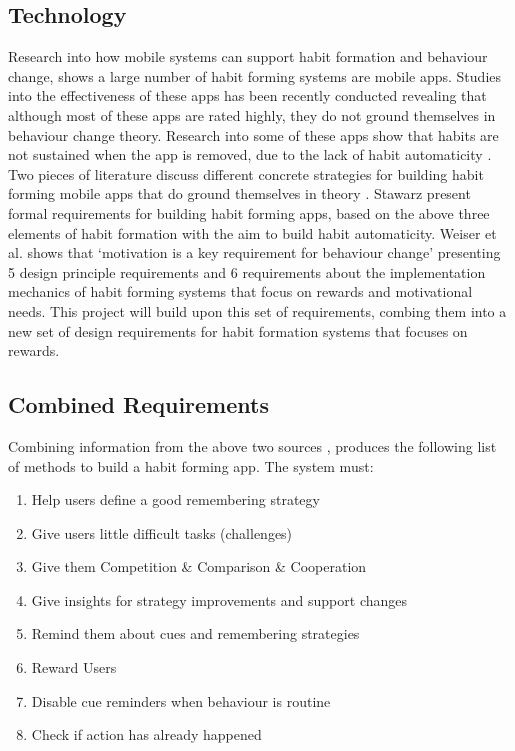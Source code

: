 \subsection{Technology}
Research into how mobile systems can support habit formation and behaviour change, shows a large number of habit forming systems are mobile apps. Studies into the effectiveness of these apps has been recently conducted \cite{article_beyond_self_tracking_designing_apps, article_dont_kick_habit} revealing that although most of these apps are rated highly, they do not ground themselves in behaviour change theory. Research into some of these apps show that habits are not sustained when the app is removed, due to the lack of habit automaticity \cite{article_beyond_self_tracking_designing_apps}.\newline
\newline
Two pieces of literature discuss different concrete strategies for building habit forming mobile apps that do ground themselves in theory \cite{thesis_kathy, article_taxonomy_motivational_affordances_meaningful}. Stawarz \cite{thesis_kathy} present formal requirements for building habit forming apps, based on the above three elements of habit formation with the aim to build habit automaticity. Weiser et al. \cite{article_taxonomy_motivational_affordances_meaningful} shows that `motivation is a key requirement for behaviour change' presenting 5 design principle requirements and 6 requirements about the implementation mechanics of habit forming systems that focus on rewards and motivational needs. This project will build upon this set of requirements, combing them into a new set of design requirements for habit formation systems that focuses on rewards.

\subsection{Combined Requirements}
Combining information from the above two sources \cite{thesis_kathy, article_taxonomy_motivational_affordances_meaningful}, produces the following list of methods to build a habit forming app.\newline
\newline
The system must:

\begin{enumerate}
  \item Help users define a good remembering strategy
  \item Give users little difficult tasks (challenges)
  \item Give them Competition \& Comparison \& Cooperation
  \item Give insights for strategy improvements and support changes
  \item Remind them about cues and remembering strategies
  \item Reward Users
  \item Disable cue reminders when behaviour is routine
  \item Check if action has already happened
\end{enumerate}

